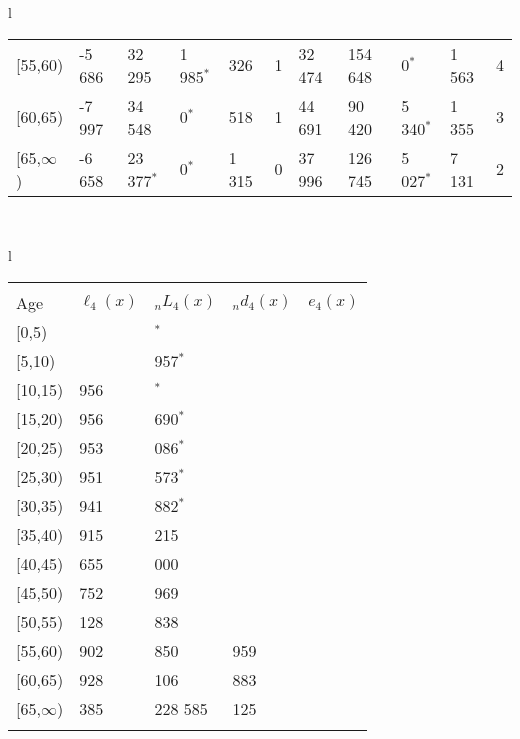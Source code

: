 \documentclass[
]{article}
\begin{document}
\begin{table}
\begin{tabular}[t]{l}
\begin{tabular}
{}[55,60) & -5 686 & 32 295 & 1 985$^{*}$ & 326 & 1 & 32 474 & 154 648 & 0$^{*}$ & 1 563 & 4\\
{}[60,65) & -7 997 & 34 548 & 0$^{*}$ & 518 & 1 & 44 691 & 90 420 & 5 340$^{*}$ & 1 355 & 3\\
{}[65,$\infty$) & -6 658 & 23 377$^{*}$ & 0$^{*}$ & 1 315 & 0 & 37 996 & 126 745 & 5 027$^{*}$ & 7 131 & 2\\
\end{tabular}\\
\end{tabular}
\centering
\begin{tabular}[t]{l}
\hline
\begin{tabular}{>{\raggedright\arraybackslash}p{.43in}>{\raggedleft\arraybackslash}p{1.3in}>{\raggedleft\arraybackslash}p{1.3in}>{\raggedleft\arraybackslash}p{1.3in}>{\raggedleft\arraybackslash}p{1.3in}}
\toprule
\multicolumn{1}{c}{ } & \multicolumn{4}{c}{(4) Lost both} \\
\cmidrule(l{3pt}r{3pt}){2-5}
Age & $\ell_{4}(x)$ & ${}_nL_{4}(x)$ & ${}_nd_{4}(x)$ & $e_{4}(x)$\\
\midrule
{}[0,5) & 0 & 0$^{*}$ & 0 & 20\\
{}[5,10) & 0 & 1 957$^{*}$ & 0 & 20\\
{}[10,15) & 1 956 & 0$^{*}$ & 0 & 20\\
{}[15,20) & 1 956 & 6 690$^{*}$ & 4 & 20\\
{}[20,25) & 1 953 & 2 086$^{*}$ & 2 & 20\\
\addlinespace
{}[25,30) & 1 951 & 7 573$^{*}$ & 9 & 20\\
{}[30,35) & 1 941 & 14 882$^{*}$ & 26 & 20\\
{}[35,40) & 1 915 & 36 215 & 87 & 20\\
{}[40,45) & 3 655 & 50 000 & 171 & 20\\
{}[45,50) & 9 752 & 51 969 & 241 & 20\\
\addlinespace
{}[50,55) & 12 128 & 100 838 & 676 & 19\\
{}[55,60) & 27 902 & 193 850 & 1 959 & 19\\
{}[60,65) & 27 928 & 259 106 & 3 883 & 18\\
{}[65,$\infty$) & 29 385 & 1 228 585 & 69 125 & 16\\
\bottomrule
\multicolumn{5}{l}{\rule{0pt}{1em}\textsuperscript{*} Based on an estimated from SIPP with less than 10 respondents in the numerator.}\\
\end{tabular}\\
\end{tabular}
\end{table}
\end{document}

